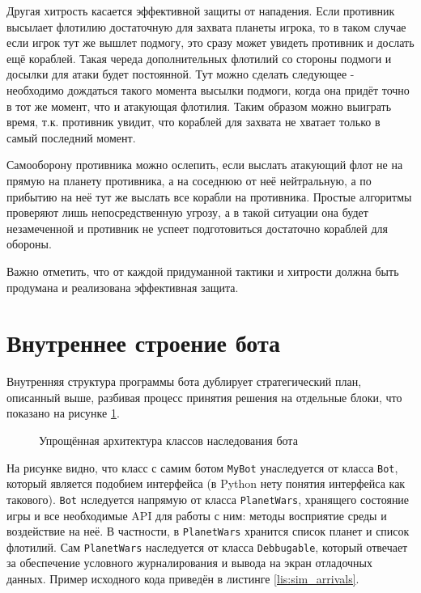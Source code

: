 \documentclass[12pt]{report}
\begin{document}
Другая хитрость касается эффективной защиты от нападения. Если противник высылает флотилию достаточную для захвата планеты игрока, то в таком случае если игрок тут же вышлет подмогу, это сразу может увидеть противник и дослать ещё кораблей. Такая череда дополнительных флотилий со стороны подмоги и досылки для атаки будет постоянной. Тут можно сделать следующее - необходимо дождаться такого момента высылки подмоги, когда она придёт точно в тот же момент, что и атакующая флотилия. Таким образом можно выиграть время, т.к. противник увидит, что кораблей для захвата не хватает только в самый последний момент.

Самооборону противника можно ослепить, если выслать атакующий флот не на прямую на планету противника, а на соседнюю от неё нейтральную, а по прибытию на неё тут же выслать все корабли на противника. Простые алгоритмы проверяют лишь непосредственную угрозу, а в такой ситуации она будет незамеченной и противник не успеет подготовиться достаточно кораблей для обороны.

Важно отметить, что от каждой придуманной тактики и хитрости должна быть продумана и реализована эффективная защита.
\pagebreak
\section{Внутреннее строение бота}
Внутренняя структура программы бота дублирует стратегический план, описанный выше, разбивая процесс принятия решения на отдельные блоки, что показано на рисунке \ref{fig:bot_arch}.

\begin{figure}[h]
	\centering
	
	\caption{Упрощённая архитектура классов наследования бота}
	\label{fig:bot_arch}
\end{figure}

На рисунке видно, что класс с самим ботом \texttt{MyBot} унаследуется от класса \texttt{Bot}, который является подобием интерфейса (в Python нету понятия интерфейса как такового). \texttt{Bot} нследуется напрямую от класса \texttt{PlanetWars}, хранящего состояние игры и все необходимые API для работы с ним: методы восприятие среды и воздействие на неё. В частности, в \texttt{PlanetWars} хранится список планет и список флотилий. Сам \texttt{PlanetWars} наследуется от класса \texttt{Debbugable}, который отвечает за обеспечение условного журналирования и вывода на экран отладочных данных. 
Пример исходного кода приведён в листинге \ref{lis:sim_arrivals}.

\lstset{caption=Метод симулирующий прибытия флотилий,label=lis:sim_arrivals,basicstyle=\footnotesize\ttfamily,captionpos=b,breaklines=true,breakatwhitespace=false,numbers=left,numbersep=5pt,language=Python,frame=single}

\end{document}
